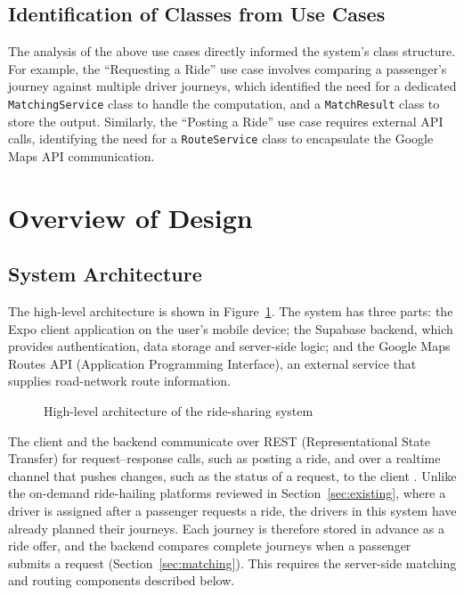 \subsection{Identification of Classes from Use Cases}

The analysis of the above use cases directly informed the system's class structure. For example, the ``Requesting a Ride'' use case involves comparing a passenger's journey against multiple driver journeys, which identified the need for a dedicated \texttt{MatchingService} class to handle the computation, and a \texttt{MatchResult} class to store the output. Similarly, the ``Posting a Ride'' use case requires external API calls, identifying the need for a \texttt{RouteService} class to encapsulate the Google Maps API communication.

\section{Overview of Design}

\subsection{System Architecture}

The high-level architecture is shown in Figure~\ref{fig:architecture}. The system has three parts: the Expo client application on the user's mobile device; the Supabase backend, which provides authentication, data storage and server-side logic; and the Google Maps Routes API (Application Programming Interface), an external service that supplies road-network route information.

\begin{figure}[htbp]
  \centering
  \caption{High-level architecture of the ride-sharing system}
  \label{fig:architecture}
\end{figure}

The client and the backend communicate over REST (Representational State Transfer) for request--response calls, such as posting a ride, and over a realtime channel that pushes changes, such as the status of a request, to the client \citep{supabase2026}. Unlike the on-demand ride-hailing platforms reviewed in Section~\ref{sec:existing}, where a driver is assigned after a passenger requests a ride, the drivers in this system have already planned their journeys. Each journey is therefore stored in advance as a ride offer, and the backend compares complete journeys when a passenger submits a request (Section~\ref{sec:matching}). This requires the server-side matching and routing components described below.

